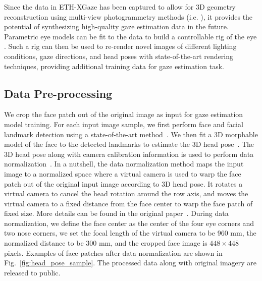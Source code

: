 \documentclass[runningheads]{llncs}
\newcommand{\datasetname}{ETH-XGaze\xspace}
\begin{document}
Since the data in \datasetname has been captured to allow for 3D geometry reconstruction using multi-view photogrammetry methods (i.e. \cite{beeler2010high}), it provides the potential of synthesizing high-quality gaze estimation data in the future. Parametric eye models \cite{wood20163d,berard2016lightweight} can be fit to the data to build a controllable rig of the eye \cite{berard2019practical}.
Such a rig can then be used to re-render novel images of different lighting conditions, gaze directions, and head poses with state-of-the-art rendering techniques, providing additional training data for gaze estimation task.


\subsection{Data Pre-processing}
\label{sec:data_preprocess}

We crop the face patch out of the original image as input for gaze estimation model training.
For each input image sample, we first perform face and facial landmark detection using a state-of-the-art method~\cite{bulat2017far}.
We then fit a 3D morphable model of the face to the detected landmarks to estimate the 3D head pose~\cite{huber2016multiresolution}.
The 3D head pose along with camera calibration information is used to perform data normalization~\cite{zhang2018revisiting}.
In a nutshell, the data normalization method maps the input image to a normalized space where a virtual camera is used to warp the face patch out of the original input image according to 3D head pose.
It rotates a virtual camera to cancel the head rotation around the row axis, and moves the virtual camera to a fixed distance from the face center to warp the face patch of fixed size.
More details can be found in the original paper~\cite{zhang2018revisiting}.
During data normalization, we define the face center as the center of the four eye corners and two nose corners, we set the focal length of the virtual camera to be 960 mm, the normalized distance to be 300 mm, and the cropped face image is $448\times448$ pixels.
Examples of face patches after data normalization are shown in Fig.~\ref{fig:head_pose_sample}.
The processed data along with original imagery are released to public.
\end{document}

